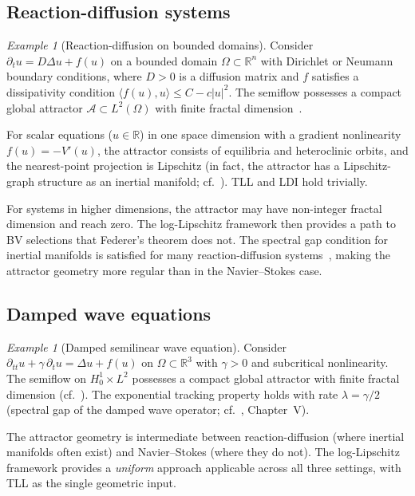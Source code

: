 \documentclass[12pt,a4paper]{article}
\theoremstyle{definition}
\theoremstyle{plain}
\theoremstyle{remark}
\newtheorem{example}[definition]{Example}
\begin{document}
\subsection{Reaction-diffusion systems}

\begin{example}[Reaction-diffusion on bounded domains]
\label{ex:RD}
Consider $\partial_t u = D\Delta u + f(u)$ on a bounded domain
$\Omega \subset \mathbb{R}^n$ with Dirichlet or Neumann
boundary conditions, where $D > 0$ is a diffusion matrix and
$f$ satisfies a dissipativity condition
$\langle f(u), u \rangle \le C - c|u|^2$.  The semiflow
possesses a compact global attractor $\mathcal{A} \subset L^2(\Omega)$
with finite fractal dimension~\cite{Temam1997}.

For scalar equations ($u \in \mathbb{R}$) in one space dimension
with a gradient nonlinearity $f(u) = -V'(u)$, the attractor
consists of equilibria and heteroclinic orbits, and the
nearest-point projection is Lipschitz (in fact, the attractor has
a Lipschitz-graph structure as an inertial manifold;
cf.~\cite{MalletParetSell1988}).  TLL and LDI hold trivially.

For systems in higher dimensions, the attractor may have non-integer
fractal dimension and reach zero.  The log-Lipschitz framework then
provides a path to BV selections that Federer's theorem does not.
The spectral gap condition for inertial manifolds is satisfied for
many reaction-diffusion systems~\cite{EdenFoiasNicolaenkoTemam1994},
making the attractor geometry more regular than in the
Navier--Stokes case.
\end{example}

\subsection{Damped wave equations}

\begin{example}[Damped semilinear wave equation]
\label{ex:wave}
Consider $\partial_{tt} u + \gamma\,\partial_t u = \Delta u + f(u)$
on $\Omega \subset \mathbb{R}^3$ with $\gamma > 0$ and subcritical
nonlinearity.  The semiflow on $H^1_0 \times L^2$ possesses a
compact global attractor with finite fractal dimension
(cf.~\cite{BabinVishik1992}).  The exponential tracking property
holds with rate $\lambda = \gamma/2$ (spectral gap of the damped
wave operator; cf.~\cite{BabinVishik1992}, Chapter~V).

The attractor geometry is intermediate between reaction-diffusion
(where inertial manifolds often exist) and Navier--Stokes (where
they do not).  The log-Lipschitz framework provides a
\emph{uniform} approach applicable across all three settings,
with TLL as the single geometric input.
\end{example}
\end{document}
